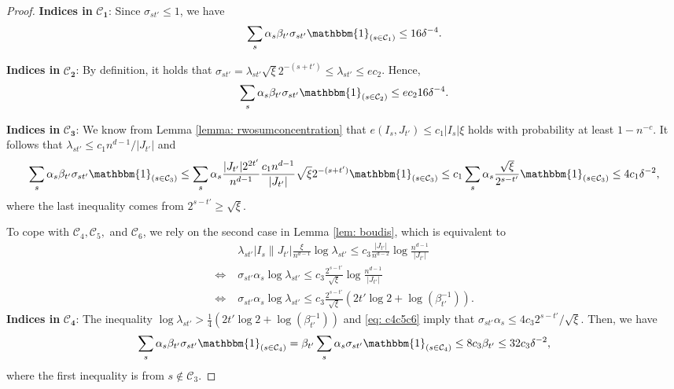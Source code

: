 \documentclass{article}
\theoremstyle{plain}
\theoremstyle{definition}
\theoremstyle{remark}
\newcommand{\CCal}{\mathcal{C}}
\begin{document}
\begin{appendix}
\begin{center}
\begin{proof}
			\textbf{Indices in} $\mathbf{\CCal_1}$: Since $\sigma_{st'}\le 1$, we have
			\begin{align}
				\sum_{s} \alpha_s \beta_{t'} \sigma_{s t'} \mathbbm{1}_{\left(s \in \mathcal{C}_1\right)} \leq 16 \delta^{-4}.
			\end{align}
			
			\textbf{Indices in} $\mathbf{\CCal_2}$: By definition, it holds that $\sigma_{s t'}=\lambda_{s t'} \sqrt{\xi} 2^{-(s+t')} \leq \lambda_{st'} \leq ec_2$. Hence,
			\begin{align}
				\sum_{s} \alpha_s \beta_{t'} \sigma_{s t'} \mathbbm{1}_{\left(s \in \mathcal{C}_2\right)} \leq ec_2 16 \delta^{-4}.
			\end{align}
			
			\textbf{Indices in} $\mathbf{\CCal_3}$: We know from Lemma \ref{lemma: rwosumconcentration} that
			$e(I_s,J_{t'}) \leq c_1 |I_s|\xi$ holds with probability at least $1-n^{-c}$. It follows that $\lambda_{st'} \leq c_1 n^{d-1}/|J_{t'}|$ and
			\begin{align*}
				\sum_{s} \alpha_s \beta_{t'} \sigma_{s t'} \mathbbm{1}_{\left(s \in \mathcal{C}_3\right)} \leq \sum_{s} \alpha_s \frac{|J_{t'}|2^{2t'}}{n^{d-1}} \frac{c_1 n^{d-1}}{|J_{t'}|} \sqrt{\xi} 2^{-(s+t')} \mathbbm{1}_{\left(s \in \mathcal{C}_3\right)}
				\leq c_1 \sum_s \alpha_s \frac{\sqrt{\xi}}{2^{s-t'}}\mathbbm{1}_{\left(s \in \mathcal{C}_3\right)}  \leq 4c_1 \delta^{-2},
			\end{align*}
   where the last inequality comes from $2^{s-t'} \ge \sqrt{\xi}$.
			
			To cope with $\CCal_4,\CCal_5,$ and $\CCal_6$, we rely on the second case in Lemma \ref{lem: boudis}, which is equivalent to
			\begin{align}
				& \lambda_{s t'}\left|I_s \| J_{t'}\right| \frac{\xi}{n^{d-1}} \log \lambda_{s t'} \leq c_3\frac{\left|J_{t'}\right|}{  n^{d-2}} \log \frac{n^{d-1}}{\left|J_{t'}\right|} \nonumber \\
				\iff \; & \sigma_{s t'} \alpha_s \log \lambda_{s t'} \leq c_3 \frac{2^{s-t'}}{\sqrt{\xi}}\log \frac{n^{d-1}}{\left|J_{t'}\right|} \nonumber \\
				\iff \; & \sigma_{s t'} \alpha_s \log \lambda_{s t'} \leq c_3 \frac{2^{s-t'}}{\sqrt{\xi}} { \left(2t' \log 2 + \log ( \beta_{t'}^{-1} ) \right)}. \label{eq: c4c5c6}
			\end{align}
			\textbf{Indices in} $\mathbf{\CCal_4}$:
			The inequality $\log \lambda_{st'} > \frac{1}{4} \left( 2t' \log 2 + \log ( \beta_{t'}^{-1} ) \right)$ and \eqref{eq: c4c5c6} imply that $\sigma_{st'} \alpha_s\leq 4c_3 2^{s-t'}/\sqrt{\xi} $. Then, we have
			\begin{align*}
				\sum_{s} \alpha_s \beta_{t'} \sigma_{s t'} \mathbbm{1}_{\left(s \in \mathcal{C}_4\right)}  =  \beta_{t'} \sum_{s} \alpha_s \sigma_{st'} \mathbbm{1}_{\left(s \in \mathcal{C}_4\right)} \leq 8c_3 \beta_{t'} \leq 32 c_3 \delta^{-2},
			\end{align*}
			where the first inequality is from $s \notin \CCal_3$.
			

\end{proof}
\end{center}
\end{appendix}
\end{document}
